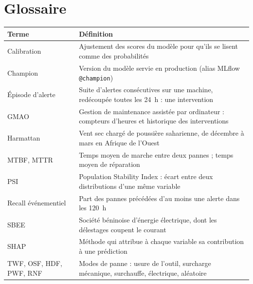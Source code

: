 \documentclass[11pt,a4paper]{article}
\newcommand{\entete}{}
\newcommand{\var}[1]{\texttt{#1}}
\begin{document}
\section*{Glossaire}

{\small
\begin{xltabular}{\linewidth}{@{}L{3.4cm}X@{}}
\toprule
\entete \textbf{Terme} & \textbf{Définition} \\
\midrule
Calibration & Ajustement des scores du modèle pour qu'ils se lisent comme des probabilités \\
Champion & Version du modèle servie en production (alias MLflow \var{@champion}) \\
Épisode d'alerte & Suite d'alertes consécutives sur une machine, redécoupée toutes les 24~h : une intervention \\
GMAO & Gestion de maintenance assistée par ordinateur : compteurs d'heures et historique des interventions \\
Harmattan & Vent sec chargé de poussière saharienne, de décembre à mars en Afrique de l'Ouest \\
MTBF, MTTR & Temps moyen de marche entre deux pannes ; temps moyen de réparation \\
PSI & Population Stability Index : écart entre deux distributions d'une même variable \\
Recall événementiel & Part des pannes précédées d'au moins une alerte dans les 120~h \\
SBEE & Société béninoise d'énergie électrique, dont les délestages coupent le courant \\
SHAP & Méthode qui attribue à chaque variable sa contribution à une prédiction \\
TWF, OSF, HDF, PWF, RNF & Modes de panne : usure de l'outil, surcharge mécanique, surchauffe, électrique, aléatoire \\
\bottomrule
\end{xltabular}}
\end{document}
